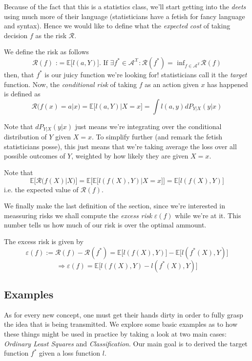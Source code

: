 Because of the fact that this is a statistics class, we'll start getting into the \textit{deets} using much more of their language (statisticians have a fetish for fancy language and syntax). Hence we would like to define what the \textit{expected cost} of taking decision $f$ as the risk $\mathcal{R}$.

\begin{definition}
    We define the risk as follows $$\mathcal{R}(f) \text{ :}= \mathbb{E}\big[l(a,Y) \big] \text{. If  } \exists f^* \in \mathcal{A}^{\mathcal{X}} : \mathcal{R}(f^*)=\text{ inf}_{f \in \mathcal{A}^{\mathcal{X}}} \mathcal{R}(f)$$ then, that $f^*$ is our juicy function we're looking for! statisticians call it the
    \textit{target} function. Now, the \textit{conditional risk} of taking $f$ as an action given $x$ has happened is defined as $$\mathcal{R}(f(x)=a|x) = \mathbb{E}\big[l(a,Y) | X = x \big] = \int l(a,y) dP_{Y|X}(y|x)$$ 
\end{definition}

Note that $dP_{Y|X}(y|x)$ just means we're integrating over the conditional distribution of $Y$ given $X=x$. To simplify further (and remark the fetish statisticians posse), this just means that we're taking average the loss over all possible outcomes of $Y$, weighted by how likely they are given $X=x$.

\begin{remark}
    Note that $$\mathbb{E}\big[ \mathcal{R}(f(X)|X) \big] = \mathbb{E}\big[ \mathbb{E}\big[l(f(X),Y) | X = x \big]\big]=\mathbb{E} \big[l(f(X),Y)\big]$$ i.e. the expected value of $\mathcal{R}(f)$.
\end{remark}

We finally make the last definition of the section, since we're interested in meassuring risks we shall compute the \textit{excess risk} $\varepsilon(f)$ while we're at it. This number tells us how much of our risk is over the optimal ammount.

\begin{definition}
    The excess risk is given by $$\varepsilon (f) := \mathcal{R}(f) - \mathcal{R}(f^*) = \mathbb{E} \big[l(f(X),Y)\big] - \mathbb{E} \big[l(f^*(X),Y)\big]$$ $$\Rightarrow \varepsilon (f) = \mathbb{E} \big[l(f(X),Y) - l(f^*(X),Y)\big]$$
\end{definition}

\subsection{Examples}
As for every new concept, one must get their hands dirty in order to fully grasp the idea that is being transmitted. We explore some basic examples as to how these things might be used in practice by taking a look at two main cases: \textit{Ordinary Least Squares} and \textit{Classification}. Our main goal is
to derived the target function $f^*$ given a loss function $l$.

